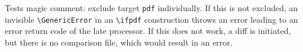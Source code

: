 \documentclass{article}
\begin{document}
Tests magic comment: exclude target \texttt{pdf} individually. 
If this is not excluded, an invisible \texttt{\textbackslash{}GenericError} 
in an \texttt{\textbackslash{}ifpdf} construction throws an error leading to an error return code 
of the late processor. 
\ifpdf%
\else
\fi
If this does not work, a diff is initiated, but there is no comparison file, 
which would result in an error. 
\end{document}
